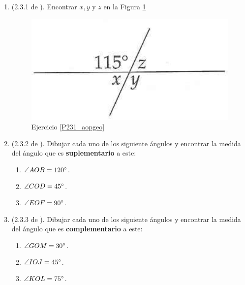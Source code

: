 \begin{enumerate}
	
	\item \label{P231_aopgeo} (2.3.1 de \cite{Aops_Geometria}). Encontrar $x,y$ y $z$ en la Figura \ref{ejer_P231_aopgeo}
	\begin{figure}[H]
		\centering
		\includegraphics[width=0.5\linewidth]{Geometria/imgs/aopsgeo_ejer_231}
		\caption{Ejercicio \ref{P231_aopgeo} }
		\label{ejer_P231_aopgeo}
	\end{figure}
	\item \label{P232_aopgeo} (2.3.2 de \cite{Aops_Geometria}).	Dibujar cada uno de los siguiente ángulos y encontrar la medida del ángulo que es \textbf{suplementario} a este:
	\begin{enumerate}[label=\Alph*) ]
		\item $\angle AOB = 120\degree$.
		\item $\angle COD = 45\degree$.
		\item $\angle EOF = 90\degree$.								
	\end{enumerate}
	
	\item \label{P233_aopgeo} (2.3.3 de \cite{Aops_Geometria}).	Dibujar cada uno de los siguiente ángulos y encontrar la medida del ángulo que es \textbf{complementario} a este:
	\begin{enumerate}[label=\Alph*) ]
		\item $\angle GOM = 30\degree$.
		\item $\angle IOJ = 45\degree$.
		\item $\angle KOL = 75\degree$.							
	\end{enumerate}
	

\end{enumerate}
